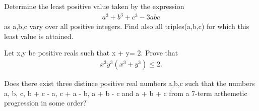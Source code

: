 \item Determine the least positive value taken by the expression
\begin{align*} 
a^{3} + b^{3} + c^{3} - 3abc
\end{align*}
 as a,b,c vary over all positive integers. Find also all triples(a,b,c) for which this least value is attained.

\item Let x,y be positive reals such that x + y= 2. Prove that
\begin{align*}
 x^{3}y^{3}(x^{3} + y^{3}) \leq 2.
\end{align*}

\item Does there exist three distince positive real numbers a,b,c such that the numbers a, b, c, b + c - a, 
c + a - b, a + b - c and a + b + c from a 7-term arthemetic progression in some order?

















